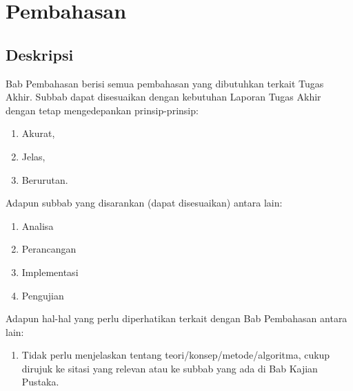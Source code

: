 \chapter{Pembahasan}
\label{bab:pembahasan}

\section{Deskripsi}
\label{sec:deskripsi}

Bab Pembahasan berisi semua pembahasan yang dibutuhkan terkait Tugas Akhir. Subbab dapat disesuaikan dengan kebutuhan Laporan Tugas Akhir dengan tetap mengedepankan prinsip-prinsip:
\begin{enumerate}
  \item Akurat,
  \item Jelas,
  \item Berurutan.
\end{enumerate}

Adapun subbab yang disarankan (dapat disesuaikan) antara lain:
\begin{enumerate}
  \item Analisa
  \item Perancangan
  \item Implementasi
  \item Pengujian
\end{enumerate}

Adapun hal-hal yang perlu diperhatikan terkait dengan Bab Pembahasan antara lain:
\begin{enumerate}
  \item Tidak perlu menjelaskan tentang teori/konsep/metode/algoritma, cukup dirujuk ke sitasi yang relevan atau ke subbab yang ada di Bab Kajian Pustaka.
\end{enumerate}

